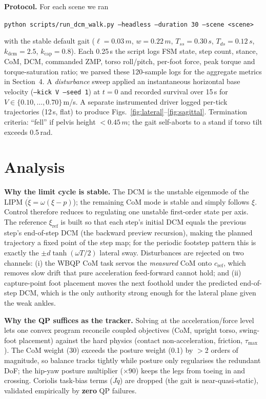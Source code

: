 \documentclass[10pt,a4paper]{article}
\newcommand{\SI}[2]{#1\,#2}          %
\newcommand{\code}[1]{\texttt{\small #1}}
\begin{document}
\textbf{Protocol.} For each scene we ran
\begin{center}\small
\code{python scripts/run\_dcm\_walk.py --headless --duration 30 --scene <scene>}
\end{center}
with the stable default gait ($\ell{=}\SI{0.03}{m}$, $w{=}\SI{0.22}{m}$,
$T_{ss}{=}\SI{0.30}{s}$, $T_{ds}{=}\SI{0.12}{s}$, $k_{\text{dcm}}{=}2.5$,
$k_{\text{cap}}{=}0.8$). Each \SI{0.25}{s} the script logs FSM state, step count,
stance, CoM, DCM, commanded ZMP, torso roll/pitch, per-foot force, peak torque
and torque-saturation ratio; we parsed these 120-sample logs for the aggregate
metrics in Section~4. A \emph{disturbance} sweep applied an instantaneous
horizontal base velocity (\code{--kick V --seed 1}) at $t{=}0$ and recorded
survival over \SI{15}{s} for $V\in\{0.10,\dots,0.70\}$\,m/s. A separate
instrumented driver logged per-tick trajectories (\SI{12}{s}, flat) to produce
Figs.~\ref{fig:lateral}--\ref{fig:sagittal}. Termination criteria: ``fell'' if
pelvis height $<\SI{0.45}{m}$; the gait self-aborts to a stand if torso tilt
exceeds \SI{0.5}{rad}.

\section{Analysis}
\textbf{Why the limit cycle is stable.} The DCM is the unstable eigenmode of the
LIPM ($\dot\xi=\omega(\xi-p)$); the remaining CoM mode is stable and simply
follows $\xi$. Control therefore reduces to regulating one unstable first-order
state per axis. The reference $\xi_{\text{ref}}$ is built so that each step's
initial DCM equals the previous step's end-of-step DCM (the backward preview
recursion), making the planned trajectory a fixed point of the step map; for the
periodic footstep pattern this is exactly the $\pm d\tanh(\omega T/2)$ lateral
sway. Disturbances are rejected on two channels: (i) the WBQP CoM task servos the
\emph{measured} CoM onto $c_{\text{ref}}$, which removes slow drift that pure
acceleration feed-forward cannot hold; and (ii) capture-point foot placement
moves the next foothold under the predicted end-of-step DCM, which is the only
authority strong enough for the lateral plane given the weak ankles.

\textbf{Why the QP suffices as the tracker.} Solving at the acceleration/force
level lets one convex program reconcile coupled objectives (CoM, upright torso,
swing-foot placement) against the hard physics (contact non-acceleration,
friction, $\tau_{\max}$). The CoM weight (30) exceeds the posture weight (0.1) by
$>$2 orders of magnitude, so balance tracks tightly while posture only regularises
the redundant DoF; the hip-yaw posture multiplier ($\times$90) keeps the legs from
toeing in and crossing. Coriolis task-bias terms ($\dot J\dot q$) are dropped (the
gait is near-quasi-static), validated empirically by \textbf{zero} QP failures.
\end{document}

